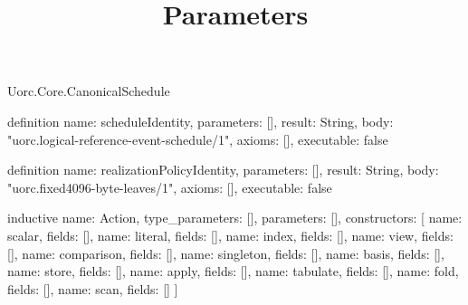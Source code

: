 \begin{lexlean}{Uorc.Core.CanonicalSchedule}
\title{Parameters}
\begin{semanticmodule}
definition{
  name: scheduleIdentity,
  parameters: [],
  result: String,
  body: "uorc.logical-reference-event-schedule/1",
  axioms: [],
  executable: false
}

definition{
  name: realizationPolicyIdentity,
  parameters: [],
  result: String,
  body: "uorc.fixed4096-byte-leaves/1",
  axioms: [],
  executable: false
}

inductive{
  name: Action,
  type_parameters: [],
  parameters: [],
  constructors: [
    {name: scalar, fields: []},
    {name: literal, fields: []},
    {name: index, fields: []},
    {name: view, fields: []},
    {name: comparison, fields: []},
    {name: singleton, fields: []},
    {name: basis, fields: []},
    {name: store, fields: []},
    {name: apply, fields: []},
    {name: tabulate, fields: []},
    {name: fold, fields: []},
    {name: scan, fields: []}
  ]
}


\end{semanticmodule}
\end{lexlean}
